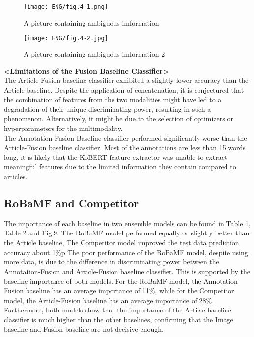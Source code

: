 \documentclass{article}
\begin{document}
\begin{figure}[ht]
    \centering
    \begin{minipage}{0.48\textwidth}
        \centering
        \texttt{[image: ENG/fig.4-1.png]} %
        \caption{A picture containing ambiguous imformation}
        \label{fig.7}
        
    \end{minipage}\hfill
    \begin{minipage}{0.48\textwidth}
        \centering
        \texttt{[image: ENG/fig.4-2.jpg]} %
        \caption{A picture containing ambiguous imformation 2}
        \label{fig.8}
    \end{minipage}
\end{figure}



\textbf{<Limitations of the Fusion Baseline Classifier>} \\
The Article-Fusion baseline classifier exhibited a slightly lower accuracy than the Article baseline. Despite the application of concatenation, it is conjectured that the combination of features from the two modalities might have led to a degradation of their unique discriminating power, resulting in such a phenomenon. Alternatively, it might be due to the selection of optimizers or hyperparameters for the multimodality. \\
The Annotation-Fusion Baseline classifier performed significantly worse than the Article-Fusion baseline classifier. Most of the annotations are less than 15 words long, it is likely that the KoBERT feature extractor was unable to extract meaningful features due to the limited information they contain compared to articles.

\subsection{RoBaMF and Competitor}
The importance of each baseline in two ensemble models can be found in Table 1, Table 2 and Fig.9.
The RoBaMF model performed equally or slightly better than the Article baseline, The Competitor model improved the test data prediction accuracy about 1\%p
The poor performance of the RoBaMF model, despite using more data, is due to the difference in discriminating power between the Annotation-Fusion and Article-Fusion baseline classifier.
This is supported by the baseline importance of both models.
For the RoBaMF model, the Annotation-Fusion baseline has an average importance of 11\%, while for the Competitor model, the Article-Fusion baseline has an average importance of 28\%.
Furthermore, both models show that the importance of the Article baseline classifier is much higher than the other baselines, confirming that the Image baseline and Fusion baseline are not decisive enough.
\end{document}
